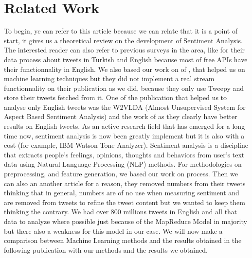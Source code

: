 \documentclass{acmtog} %
\begin{document}
\section{Related Work}
\label{sec:related_work}
To begin, ye can refer to this article \cite{Palpanas11} because we can relate that it is a point of start, it gives us a theoretical review on the development of Sentiment Analysis. The interested reader can also refer to previous surveys in the area, like \cite{Ayvazb17} for their data process about tweets in Turkish and English  because most of free APIs have their functionnality in English. We also based our work on of \cite{Badhani17}, that helped us on machine learning techniques but they did not implement a real stream functionnality on their publication as we did, because they only use Tweepy and store their tweets fetched from it. One of the publication that helped us to analyse only English tweets was the W2VLDA (Almost Unsupervised System for Aspect Based Sentiment Analysis) and the work of \cite{Cuadros17} as they clearly have better results on English tweets. As an active research field that has emerged for a long time now, sentiment analysis is now been greatly implement but it is also with a cost (for example, IBM Watson Tone Analyzer). Sentiment analysis is a discipline that extracts people's feelings, opinions, thoughts and behaviors from user's text data using Natural Language Processing (NLP) \cite{Rebecca11} methods. For methodologies on preprocessing, and feature generation, we based our work on process. Then we can also an another article for a reason, they removed numbers from their tweets \cite{Lin18}  thinking that in general, numbers are of no use when measuring sentiment and are removed from tweets to refine the tweet content but we wanted to keep them thinking the contrary. We had over 800 millions tweets in English and all that data to analyze where possible just because of the MapReduce Model in majority but there also a weakness for this model in our case.
We will now make a comparison between Machine Learning methods and the results obtained in the following publication \cite{Baltas17} with our methods and the results we obtained.
\end{document}
